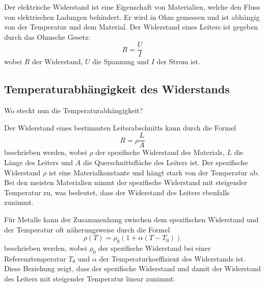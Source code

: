 Der elektrische Widerstand ist eine Eigenschaft von Materialien, welche den Fluss von elektrischen
Ladungen behindert. Er wird in Ohm gemessen und ist abhängig von der Temperatur und dem Material.
Der Widerstand eines Leiters ist gegeben durch das Ohmsche Gesetz:
\begin{equation}
    R = \frac{U}{I}
\end{equation}
wobei $R$ der Widerstand, $U$ die Spannung und $I$ der Strom ist.


\subsection{Temperaturabhängigkeit des Widerstands}
Wo steckt nun die Temperaturabhängigkeit?

Der Widerstand eines bestimmten Leiterabschnitts kann durch die Formel
\begin{equation}
    R = \rho \frac{L}{A}
\end{equation}
beschrieben werden, wobei $\rho$ der spezifische Widerstand des Materials, $L$ die Länge des Leiters und $A$ die Querschnittsfläche des Leiters ist. Der spezifische Widerstand $\rho$ ist eine Materialkonstante und hängt stark von der Temperatur ab. Bei den meisten Materialien nimmt der spezifische Widerstand mit steigender Temperatur zu, was bedeutet, dass der Widerstand des Leiters ebenfalls zunimmt.

Für Metalle kann der Zusammenhang zwischen dem spezifischen Widerstand und der Temperatur oft näherungsweise durch die Formel
\begin{equation}
    \rho(T) = \rho_0 (1 + \alpha (T - T_0))
\end{equation}
beschrieben werden, wobei $\rho_0$ der spezifische Widerstand bei einer Referenztemperatur $T_0$ und $\alpha$ der Temperaturkoeffizient des Widerstands ist. Diese Beziehung zeigt, dass der spezifische Widerstand und damit der Widerstand des Leiters mit steigender Temperatur linear zunimmt.
